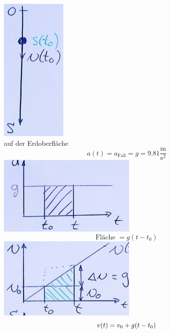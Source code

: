 \begin{bsp*}[note = Der freie Fall]
	\includegraphics{Bild8} \\
	auf der Erdoberfläche
	\[ a(t) = a_{\text{Fall}} = g = 9.81 \frac{\text{m}}{{\text{s}}^2} \]
	\includegraphics{Bild9}
	\[ \text{Fläche } = g( t - t_0 ) \]
	\includegraphics{Bild10}
	\[
		v(t) = v_0 + g( t - t_0 ) \\
\]
\end{bsp*}
